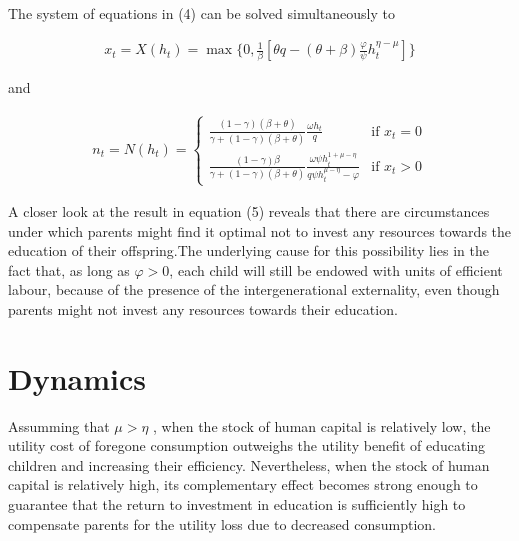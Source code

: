 \begin{enumerate}[label=(\alph*)]
\begin{enumerate}[label=(\roman*)]
\begin{equation}
\begin{aligned}
    \end{aligned}
    \end{equation}

The system of equations in (4) can be solved simultaneously to

    \begin{equation}
    \begin{aligned}
    x_t = X(h_t)  = \max \{0, \frac{1}{\beta}[\theta q - (\theta + \beta) \frac{\varphi}{\psi}  h_t^{\eta - \mu}]\}
    \end{aligned}
    \end{equation}
    
and

    \begin{equation}
    \begin{aligned}
    n_t = N(h_t)  = \begin{cases}
                    \frac{(1-\gamma)(\beta + \theta)}{\gamma + (1-\gamma)(\beta + \theta)} \frac{\omega h_t}{q} & \text{if } x_t = 0 \\
                    \frac{(1-\gamma)\beta}{\gamma + (1-\gamma)(\beta + \theta)} \frac{\omega \psi h_t^{1 + \mu - \eta }}{q \psi h_t^{\mu - \eta} - \varphi}   & \text{if } x_t > 0
                     \end{cases}
    \end{aligned}
    \end{equation}
    
A closer look at the result in equation (5) reveals that there are circumstances under which parents might find it optimal not to invest any
resources towards the education of their offspring.The underlying cause for this possibility lies in the fact that, as long as $ \varphi > 0$, each child will still be endowed with units of efficient labour, because of the presence of the intergenerational externality, even though parents might not invest any resources towards their education.

\section{Dynamics} 

Assumming that  $\mu > \eta $ , when the stock of human capital is relatively low, the utility cost of foregone consumption outweighs the utility
benefit of educating children and increasing their efficiency. Nevertheless, when the stock of human capital is relatively high, its complementary
effect becomes strong enough to guarantee that the return to investment in education is sufficiently high to compensate parents for the utility loss
due to decreased consumption.


\end{enumerate}
\end{enumerate}
